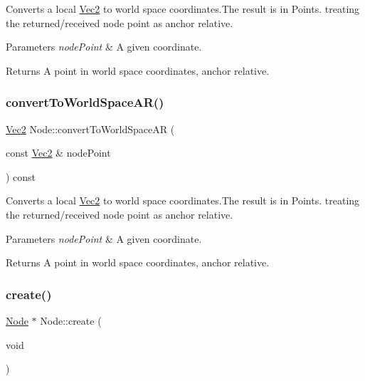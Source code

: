 Converts a local \hyperlink{classVec2}{Vec2} to world space coordinates.\+The result is in Points. treating the returned/received node point as anchor relative.


\begin{DoxyParams}{Parameters}
{\em node\+Point} & A given coordinate. \\
\hline
\end{DoxyParams}
\begin{DoxyReturn}{Returns}
A point in world space coordinates, anchor relative. 
\end{DoxyReturn}
\mbox{\label{classNode_a84c532f970a06aec83dc881e70526b8e}} 
\subsubsection{\texorpdfstring{convert\+To\+World\+Space\+A\+R()}{convertToWorldSpaceAR()}\hspace{0.1cm}{\footnotesize\ttfamily [2/2]}}
{\footnotesize\ttfamily \hyperlink{classVec2}{Vec2} Node\+::convert\+To\+World\+Space\+AR (\begin{DoxyParamCaption}\item[{const \hyperlink{classVec2}{Vec2} \&}]{node\+Point }\end{DoxyParamCaption}) const}

Converts a local \hyperlink{classVec2}{Vec2} to world space coordinates.\+The result is in Points. treating the returned/received node point as anchor relative.


\begin{DoxyParams}{Parameters}
{\em node\+Point} & A given coordinate. \\
\hline
\end{DoxyParams}
\begin{DoxyReturn}{Returns}
A point in world space coordinates, anchor relative. 
\end{DoxyReturn}
\mbox{\label{classNode_aa9a92a1756b585d707a42c3fd1b274d4}} 
\subsubsection{\texorpdfstring{create()}{create()}\hspace{0.1cm}{\footnotesize\ttfamily [1/2]}}
{\footnotesize\ttfamily \hyperlink{classNode}{Node} $\ast$ Node\+::create (\begin{DoxyParamCaption}\item[{void}]{ }\end{DoxyParamCaption})\hspace{0.3cm}{\ttfamily [static]}}

